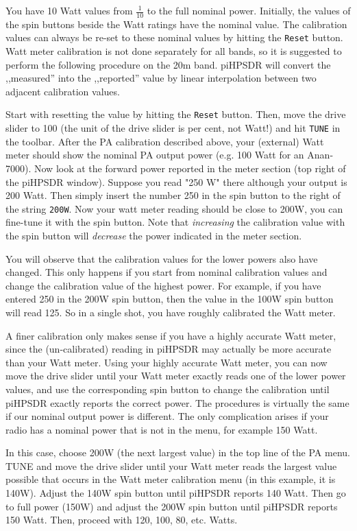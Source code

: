 \documentclass[12pt]{book}
\def\rett#1{\texttt{\color{red}#1}}
\def\pH{pi\-HPSDR }
\begin{document}
You have 10 Watt values from $\frac{1}{10}$ to the full nominal power. Initially,
the values of the spin buttons beside the Watt ratings have the nominal value.
The calibration values can always be re-set to these nominal values by hitting
the \rett{Reset} button. Watt meter calibration is not done separately for all
bands, so it is suggested to perform the following procedure on the 20m band.
\pH will convert the ,,measured'' into the ,,reported'' value by linear
interpolation between two adjacent calibration values.

Start with resetting the value by hitting the \rett{Reset} button. Then, move the
drive slider to 100 (the unit of the drive slider is per cent, not Watt!) and hit
\texttt{TUNE} in the toolbar.
 After the PA calibration described above, your (external) Watt meter should
show the nominal PA output power (e.g. 100 Watt for an Anan-7000). Now look at the
forward power reported in the meter section (top right of the \pH window).
Suppose you read "250 W" there although your output is 200 Watt. Then simply
insert the number 250 in the spin button to the right of the string
\rett{200W}. Now your watt meter reading should be close to 200W, you can fine-tune
it with the spin button. Note that \textit{increasing} the calibration value
with the spin button will \textit{decrease} the power indicated in the meter section.

You will observe that the calibration values for the lower powers also have changed.
This only happens if you start from nominal calibration values and change the
calibration value of the highest power. For example, if you have entered 250 in
the 200W spin button, then the value in the 100W spin button will read 125. So in a
single shot, you have roughly calibrated the Watt meter.

A finer calibration only makes sense if you have a highly accurate Watt meter, since
the (un-calibrated) reading in \pH may actually be more accurate than your
Watt meter. Using your highly accurate Watt meter,
you can now move the drive slider until your Watt meter exactly reads one of the
lower power values, and use the corresponding spin button to change the calibration
until \pH exactly reports the correct power.
The procedures is  virtually the same if our nominal output power is different.
The only complication arises if your radio has a nominal power that is not in the menu,
for example 150 Watt.

In this case, choose 200W (the next largest value)
in the top line of the PA menu. TUNE and move the drive
slider until your Watt meter reads the largest value possible that occurs
in the Watt meter calibration menu (in this example, it is 140W). Adjust the
140W spin button until \pH reports 140 Watt. Then go to full power
(150W) and adjust the 200W spin button until \pH reports 150 Watt.
Then, proceed with 120, 100, 80, etc. Watts.
\end{document}
